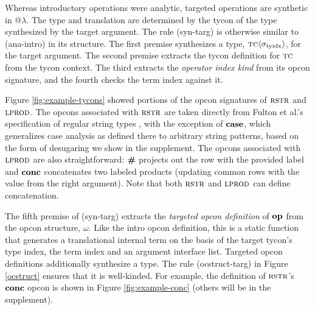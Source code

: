 Whereas introductory operations were analytic, targeted operations are synthetic in @$\lambda$. The type and translation are determined by the tycon of the type synthesized by the target argument. The rule (syn-targ) is otherwise similar to (ana-intro) in its structure. The first premise synthesizes a type, ${\textsc{tc}}\langle\sigma_\text{tyidx}\rangle$, for the target argument. The second premise extracts the tycon definition for $\textsc{tc}$ from the tycon context. The third extracts the \emph{operator index kind} from its opcon signature, and the fourth checks the term index against it. 

Figure \ref{fig:example-tycons} showed portions of the opcon signatures of $\textsc{rstr}$ and $\textsc{lprod}$. The opcons associated with $\textsc{rstr}$ are taken directly from Fulton et al.'s specification of regular string types \cite{sanitation-psp14}, with the exception of $\textbf{case}$, which generalizes case analysis as defined there to arbitrary string patterns, based on the form of desugaring we show in the supplement. The opcons associated with $\textsc{lprod}$ are also straightforward: $\textbf{\#}$ projects out the row with the provided label and $\textbf{conc}$ concatenates two labeled products (updating common rows with the value from the right argument). Note that both $\textsc{rstr}$ and $\textsc{lprod}$ can define concatenation. %

The fifth premise of (syn-targ) extracts the \emph{targeted opcon definition} of $\textbf{op}$ from the opcon structure, $\omega$. Like the intro opcon definition, this is a static function that generates a translational internal term on the basis of the target tycon's type index, the term index and an argument interface list. Targeted opcon definitions additionally synthesize a type. The rule (ocstruct-targ) in Figure \ref{ocstruct} ensures that it is well-kinded. For example, the definition of $\textsc{rstr}$'s  $\textbf{conc}$ opcon is shown in Figure \ref{fig:example-conc} (others will be in the supplement).

